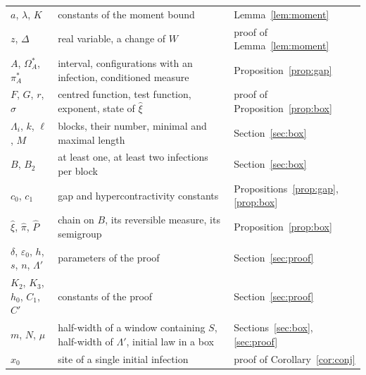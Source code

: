 \documentclass[11pt]{amsart}
\theoremstyle{definition}
\theoremstyle{remark}
\begin{document}
\begin{center}
\begin{tabular}{p{3.4cm}p{7.4cm}p{3.2cm}}
$a$, $\lambda$, $K$ & constants of the moment bound & Lemma~\ref{lem:moment}\\
$z$, $\Delta$ & real variable, a change of $W$ & proof of Lemma~\ref{lem:moment}\\
$A$, $\Omega^*_A$, $\pi^*_A$ & interval, configurations with an infection, conditioned measure & Proposition~\ref{prop:gap}\\
$F$, $G$, $r$, $\sigma$ & centred function, test function, exponent, state of $\hat\xi$ & proof of Proposition~\ref{prop:box}\\
$\Lambda_i$, $k$, $\ell$, $M$ & blocks, their number, minimal and maximal length & Section~\ref{sec:box}\\
$B$, $B_2$ & at least one, at least two infections per block & Section~\ref{sec:box}\\
$c_0$, $c_1$ & gap and hypercontractivity constants & Propositions~\ref{prop:gap}, \ref{prop:box}\\
$\hat\xi$, $\hat\pi$, $\hat P$ & chain on $B$, its reversible measure, its semigroup & Proposition~\ref{prop:box}\\
$\delta$, $\varepsilon_0$, $h$, $s$, $n$, $\Lambda'$ & parameters of the proof & Section~\ref{sec:proof}\\
$K_2$, $K_3$, $h_0$, $C_1$, $C'$ & constants of the proof & Section~\ref{sec:proof}\\
$m$, $N$, $\mu$ & half-width of a window containing $S$, half-width of $\Lambda'$, initial law in a box & Sections~\ref{sec:box}, \ref{sec:proof}\\
$x_0$ & site of a single initial infection & proof of Corollary~\ref{cor:conj}\\
\bottomrule
\end{tabular}
\end{center}
\end{document}
